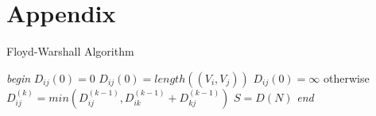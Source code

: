 \documentclass[dareport.tex]{subfiles}
\begin{document}
\section{Appendix}


\begin{algorithm}
\caption{Floyd-Warshall Algorithm}\label{euclid}
\begin{algorithmic}[1]
\BState \emph{begin}
\State $D_{ij}(0) = 0$
\EndIf
{}
\State $D_{ij}(0) = length((V_{i}, V_{j}))$
\EndIf
\State $D_{ij}(0) = \infty $ otherwise
\State $D_{ij}^{(k)}=min(D_{ij}^{(k-1)}, D_{ik}^{(k-1)}+D_{kj}^{(k-1)})$
\EndFor
\EndFor
\EndFor
${S = D(N)}$
\BState \emph{end}
\EndProcedure
\end{algorithmic}
\end{algorithm}
\end{document}
